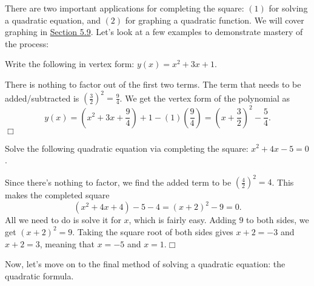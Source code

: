 \documentclass[lang=en,11pt]{elegantbook}
\begin{document}
There are two important applications for completing the square: $(1)$ for solving a quadratic equation, and $(2)$ for graphing a quadratic function.  We will cover graphing in \hyperlink{section.5.9}{Section 5.9}.  Let's look at a few examples to demonstrate mastery of the process:
\begin{example}
Write the following in vertex form: $y(x)=x^2+3x+1$.
\end{example}
\begin{solution}
There is nothing to factor out of the first two terms.  The term that needs to be added/subtracted is $\displaystyle \left(\frac{3}{2}\right)^2=\frac{9}{4}$.  We get the vertex form of the polynomial as $$y(x)=\left(x^2+3x+\frac{9}{4}\right)+1-\left(1\right)\left(\frac{9}{4}\right)=\left(x+\frac{3}{2}\right)^2-\frac{5}{4}.$$$\Box$
\end{solution}
\begin{example}
Solve the following quadratic equation via completing the square: $x^2+4x-5=0$.
\end{example}
\begin{solution}
Since there's nothing to factor, we find the added term to be $\displaystyle \left(\frac{4}{2}\right)^2=4$.  This makes the completed square $$\left(x^2+4x+4\right)-5-4=(x+2)^2-9=0.$$  All we need to do is solve it for $x$, which is fairly easy.  Adding $9$ to both sides, we get $(x+2)^2=9$.  Taking the square root of both sides gives $x+2=-3$ and $x+2=3$, meaning that $x=-5$ and $x=1$.$\Box$
\end{solution}
\noindent Now, let's move on to the final method of solving a quadratic equation: the quadratic formula.
\end{document}
